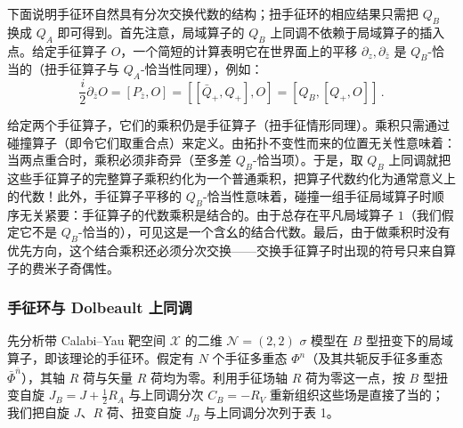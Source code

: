 下面说明手征环自然具有分次交换代数的结构；扭手征环的相应结果只需把 $Q_B$ 换成 $Q_A$ 即可得到。首先注意，局域算子的 $Q_B$ 上同调不依赖于局域算子的插入点。给定手征算子 $O$，一个简短的计算表明它在世界面上的平移 $\partial_z,\partial_{\bar z}$ 是 $Q_B$-恰当的（扭手征算子与 $Q_A$-恰当性同理），例如：
\[
\frac{i}{2}\partial_{\bar z}O=[P_{\bar z},O]=[[\bar Q_+,Q_+],O]=[Q_B,[Q_+,O]]\,.
\]

给定两个手征算子，它们的乘积仍是手征算子（扭手征情形同理）。乘积只需通过碰撞算子（即令它们取重合点）来定义。由拓扑不变性而来的位置无关性意味着：当两点重合时，乘积必须非奇异（至多差 $Q_B$-恰当项）。于是，取 $Q_B$ 上同调就把这些手征算子的完整算子乘积约化为一个普通乘积，把算子代数约化为通常意义上的代数！此外，手征算子平移的 $Q_B$-恰当性意味着，碰撞一组手征局域算子时顺序无关紧要：手征算子的代数乘积是结合的。由于总存在平凡局域算子 $1$（我们假定它不是 $Q_B$-恰当的），可见这是一个含幺的结合代数。最后，由于做乘积时没有优先方向，这个结合乘积还必须分次交换——交换手征算子时出现的符号只来自算子的费米子奇偶性。

\subsubsection{手征环与 Dolbeault 上同调}

先分析带 Calabi--Yau 靶空间 $\mathcal{X}$ 的二维 $\mathcal{N}=(2,2)$ $\sigma$ 模型在 $B$ 型扭变下的局域算子，即该理论的手征环。假定有 $N$ 个手征多重态 $\Phi^n$（及其共轭反手征多重态 $\bar\Phi^{\bar n}$），其轴 $R$ 荷与矢量 $R$ 荷均为零。利用手征场轴 $R$ 荷为零这一点，按 $B$ 型扭变自旋 $J_B=J+\frac12R_A$ 与上同调分次 $C_B=-R_V$ 重新组织这些场是直接了当的；我们把自旋 $J$、$R$ 荷、扭变自旋 $J_B$ 与上同调分次列于表 1。

